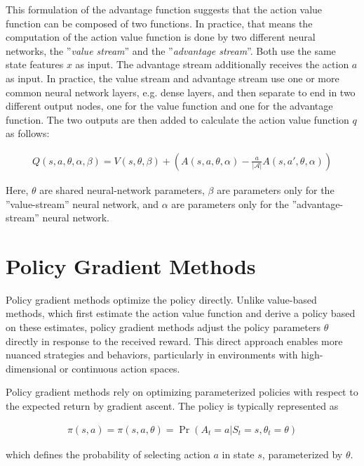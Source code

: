 This formulation of the advantage function suggests that the action value function can be composed of two functions. In practice, that means the computation of the action value function is done by two different neural networks, the ''\emph{value stream}'' and the ''\emph{advantage stream}''. Both use the same state features $x$ as input. The advantage stream additionally receives the action $a$ as input. In practice, the value stream and advantage stream use one or more common neural network layers, e.g. dense layers, and then separate to end in two different output nodes, one for the value function and one for the advantage function. The two outputs are then added to calculate the action value function $q$ as follows:

\begin{align*}
Q(s, a, \theta, \alpha, \beta) = V(s, \theta, \beta) + \left( A(s, a, \theta, \alpha) - \frac{a}{|\mathcal{A}|} A(s, a', \theta, \alpha) \right)
\end{align*}

Here, $\theta$ are shared neural-network parameters, $\beta$ are parameters only for the ''value-stream'' neural network, and $\alpha$ are parameters only for the ''advantage-stream'' neural network.

\section{Policy Gradient Methods}

Policy gradient methods optimize the policy directly. Unlike value-based methods, which first estimate the action value function and derive a policy based on these estimates, policy gradient methods adjust the policy parameters $\theta$ directly in response to the received reward. This direct approach enables more nuanced strategies and behaviors, particularly in environments with high-dimensional or continuous action spaces.

Policy gradient methods rely on optimizing parameterized policies with respect to the expected return by gradient ascent. The policy is typically represented as 

\begin{align*}
\pi(s, a) = \pi(s, a, \theta) = \Pr(A_t = a | S_t = s, \theta_t = \theta)
\end{align*}

which defines the probability of selecting action $a$ in state $s$, parameterized by $\theta$. 

